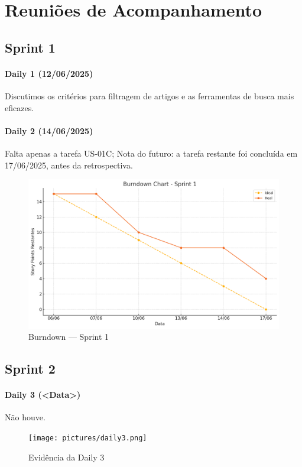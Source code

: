 \section{Reuniões de Acompanhamento}

\subsection{Sprint 1}

\paragraph{Daily 1 (12/06/2025)} Discutimos os critérios para filtragem de artigos e as ferramentas de busca mais eficazes.

\paragraph{Daily 2 (14/06/2025)} Falta apenas a tarefa US-01C; Nota do futuro: a tarefa restante foi concluída em 17/06/2025, antes da retrospectiva.

\begin{figure}[htbp]
  \centering
  \includegraphics[width=0.7\linewidth]{pictures/burndown_sprint1.png}
  \caption{Burndown — Sprint 1}
\end{figure}

\subsection{Sprint 2}

\paragraph{Daily 3 (\textless Data\textgreater)} Não houve.

\begin{figure}[htbp]
  \centering
  \texttt{[image: pictures/daily3.png]}
  \caption{Evidência da Daily 3}
\end{figure}

